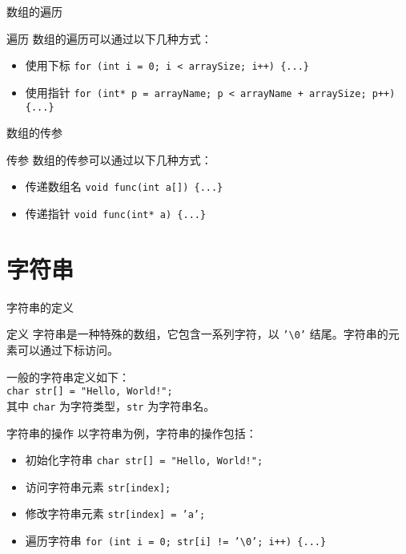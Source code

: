 \documentclass{beamer}
\begin{document}
\begin{frame}{数组的遍历}
    \begin{block}{遍历}
        数组的遍历可以通过以下几种方式：
        \begin{itemize}
            \item<1-> 使用下标
            \texttt{for (int i = 0; i < arraySize; i++) \{...\}} \\
            \item<2-> 使用指针
            \texttt{for (int* p = arrayName; p < arrayName + arraySize; p++) \{...\}} \\
        \end{itemize}
    \end{block}
\end{frame}

\begin{frame}{数组的传参}
    \begin{block}{传参}
        数组的传参可以通过以下几种方式：
        \begin{itemize}
            \item<1-> 传递数组名
            \texttt{void func(int a[]) \{...\}} \\
            \item<2-> 传递指针
            \texttt{void func(int* a) \{...\}} \\
        \end{itemize}
    \end{block}
\end{frame}

\section{字符串}
\begin{frame}{字符串的定义}
    \begin{block}{定义}
        字符串是一种特殊的数组，它包含一系列字符，以 \texttt{'\textbackslash0'} 结尾。字符串的元素可以通过下标访问。
    \end{block}
    一般的字符串定义如下： \\
    \texttt{char str[] = "Hello, World!";} \\
    其中 \texttt{char} 为字符类型，\texttt{str} 为字符串名。
\end{frame}

\begin{frame}{字符串的操作}
    以字符串为例，字符串的操作包括：
    \begin{itemize}
        \item<1-> 初始化字符串
        \texttt{char str[] = "Hello, World!";} \\
        \item<2-> 访问字符串元素
        \texttt{str[index];} \\
        \item<3-> 修改字符串元素
        \texttt{str[index] = 'a';} \\
        \item<4-> 遍历字符串
        \texttt{for (int i = 0; str[i] != '\textbackslash0'; i++) \{...\}} \\
    \end{itemize}
\end{frame}
\end{document}
